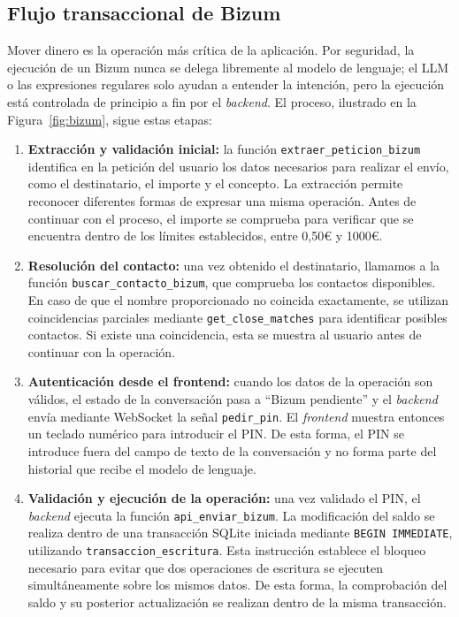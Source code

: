 \subsection{Flujo transaccional de Bizum}

Mover dinero es la operación más crítica de la aplicación. Por seguridad, la ejecución de un 
Bizum nunca se delega libremente al modelo de lenguaje; el LLM o las expresiones regulares 
solo ayudan a entender la intención, pero la ejecución está controlada de principio a fin por 
el \emph{backend}. El proceso, ilustrado en la Figura~\ref{fig:bizum}, sigue estas etapas:


\begin{enumerate}

    \item \textbf{Extracción y validación inicial:} la función
    \texttt{extraer\_peticion\_bizum} identifica en la petición del usuario los
    datos necesarios para realizar el envío, como el destinatario, el importe
    y el concepto. La extracción permite reconocer diferentes formas de
    expresar una misma operación. Antes de continuar con el proceso, el
    importe se comprueba para verificar que se encuentra dentro de los límites
    establecidos, entre 0,50€ y 1000€.

    \item \textbf{Resolución del contacto:} una vez obtenido el destinatario, llamamos a
    la función \texttt{buscar\_contacto\_bizum}, que comprueba los contactos
    disponibles. En caso de que el nombre proporcionado no coincida
    exactamente, se utilizan coincidencias parciales mediante
    \texttt{get\_close\_matches} para identificar posibles contactos. Si existe
    una coincidencia, esta se muestra al usuario antes de continuar con la
    operación.

    \item \textbf{Autenticación desde el frontend:} cuando los datos de la
    operación son válidos, el estado de la conversación pasa a ``Bizum
    pendiente'' y el \emph{backend} envía mediante WebSocket la señal
    \texttt{pedir\_pin}. El \emph{frontend} muestra entonces un teclado numérico para
    introducir el PIN. De esta forma, el PIN se introduce fuera del campo de
    texto de la conversación y no forma parte del historial que recibe el
    modelo de lenguaje.

    \item \textbf{Validación y ejecución de la operación:} una vez validado el
    PIN, el \emph{backend} ejecuta la función \texttt{api\_enviar\_bizum}. La
    modificación del saldo se realiza dentro de una transacción SQLite
    iniciada mediante \texttt{BEGIN IMMEDIATE}, utilizando
    \texttt{transaccion\_escritura}. Esta instrucción establece el bloqueo
    necesario para evitar que dos operaciones de escritura se ejecuten
    simultáneamente sobre los mismos datos. De esta forma, la comprobación del
    saldo y su posterior actualización se realizan dentro de la misma
    transacción.

\end{enumerate}

